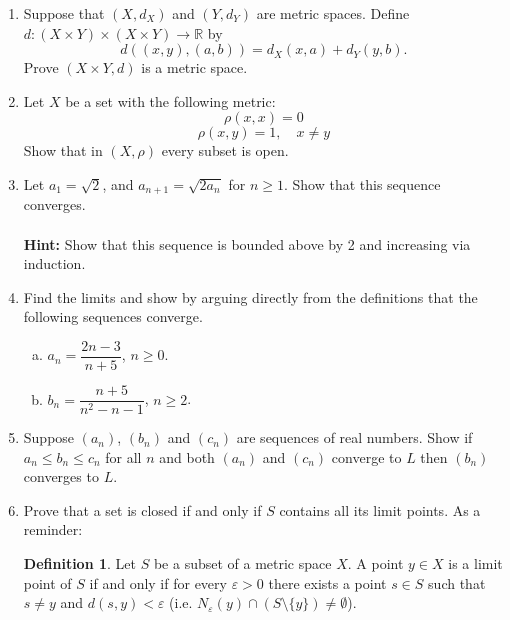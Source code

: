 \documentclass[12pt,letterpaper]{article}
\theoremstyle{plain}
\theoremstyle{definition}
\newtheorem{definition}[theorem]{Definition}
\begin{document}
\begin{enumerate}[1.]
\item Suppose that $(X, d_X)$ and $(Y,d_Y)$ are metric spaces. Define $d:(X\times Y)\times (X\times Y)\rightarrow \mathbb{R}$ by 
\[d((x,y),(a,b))=d_X(x,a)+d_Y(y,b).\]
Prove $(X\times Y, d)$ is a metric space. 
\item Let $X$ be a set with the following metric: 
\[\rho(x,x)=0\]
\[\rho(x,y)=1, \quad x\neq y\]
Show that in $(X,\rho)$ every subset is open. 
\item Let $a_1=\sqrt{2}$,  and $a_{n+1}=\sqrt{2a_n}$ for $n\geq 1$. Show that this sequence converges. \\
\ \\
{\bf Hint: } Show that this sequence is bounded above by 2 and increasing via induction. 
\item Find the limits and show by arguing directly from the definitions that the following sequences converge.
\begin{enumerate}[a)]
\item $a_n=\dfrac{2n-3}{n+5}$, $n\geq 0$. 
\item $b_n=\dfrac{n+5}{n^2-n-1}$, $n\geq 2$. 
\end{enumerate}
\item Suppose $(a_n)$, $(b_n)$ and $(c_n)$ are sequences of real numbers. Show if $a_n\leq b_n\leq c_n$ for all $n$ and both $(a_n)$ and $(c_n)$ converge to $L$ then $(b_n)$ converges to $L$.
\item Prove that a set is closed if and only if $S$ contains all its limit points. As a reminder:
 \begin{definition} Let $S$ be a subset of a metric space $X$. A point $y\in X$ is a limit point of $S$ if and only if for every $\varepsilon>0$ there exists a point $s\in S$ such that $s\neq y$ and $d(s,y)<\varepsilon$ (i.e. $N_\varepsilon(y)\cap (S\setminus \{y\})\neq \emptyset$).
\end{definition}
\end{enumerate}
\end{document}
